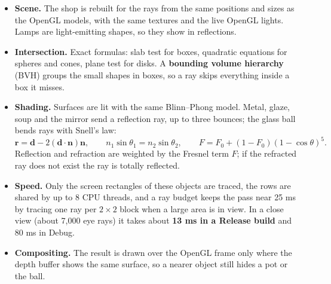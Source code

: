 \documentclass[10pt,a4paper]{article}
\begin{document}
\begin{itemize}
\item \textbf{Scene.} The shop is rebuilt for the rays from the same positions and sizes as the OpenGL models, with the same textures and the live OpenGL lights. Lamps are light-emitting shapes, so they show in reflections.
\item \textbf{Intersection.} Exact formulas: slab test for boxes, quadratic equations for spheres and cones, plane test for disks. A \textbf{bounding volume hierarchy} (BVH) groups the small shapes in boxes, so a ray skips everything inside a box it misses.
\item \textbf{Shading.} Surfaces are lit with the same Blinn--Phong model. Metal, glaze, soup and the mirror send a reflection ray, up to three bounces; the glass ball bends rays with Snell's law:
\begin{equation}
\mathbf r=\mathbf d-2(\mathbf d\!\cdot\!\mathbf n)\mathbf n,\qquad n_1\sin\theta_1=n_2\sin\theta_2,\qquad F=F_0+(1-F_0)(1-\cos\theta)^5 .
\end{equation}
Reflection and refraction are weighted by the Fresnel term $F$; if the refracted ray does not exist the ray is totally reflected.
\item \textbf{Speed.} Only the screen rectangles of these objects are traced, the rows are shared by up to 8 CPU threads, and a ray budget keeps the pass near 25 ms by tracing one ray per $2\times2$ block when a large area is in view. In a close view (about 7,000 eye rays) it takes about \textbf{13 ms in a Release build} and 80 ms in Debug.
\item \textbf{Compositing.} The result is drawn over the OpenGL frame only where the depth buffer shows the same surface, so a nearer object still hides a pot or the ball.
\end{itemize}

\end{document}
